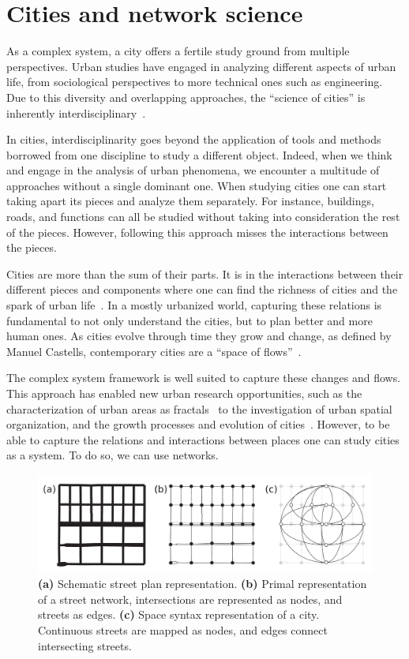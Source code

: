 \section*{Cities and network science}

As a complex system, a city offers a fertile study ground from multiple perspectives. Urban studies have engaged in analyzing different aspects of urban life, from sociological perspectives to more technical ones such as engineering. Due to this diversity and overlapping approaches, the ``science of cities'' is inherently interdisciplinary~\cite{batty2013new}.

In cities, interdisciplinarity goes beyond the application of tools and methods borrowed from one discipline to study a different object. Indeed, when we think and engage in the analysis of urban phenomena, we encounter a multitude of approaches without a single dominant one. When studying cities one can start taking apart its pieces and analyze them separately. For instance, buildings, roads, and functions can all be studied without taking into consideration the rest of the pieces. However, following this approach misses the interactions between the pieces. 

Cities are more than the sum of their parts. It is in the interactions between their different pieces and components where one can find the richness of cities and the spark of urban life~\cite{Jacobs1961Death}. In a mostly urbanized world, capturing these relations is fundamental to not only understand the cities, but to plan better and more human ones. As cities evolve through time they grow and change, as defined by Manuel Castells, contemporary cities are a ``space of flows''~\cite{castells1989informational}. 

The complex system framework is well suited to capture these changes and flows. This approach has enabled new urban research opportunities, such as the characterization of urban areas as fractals~\cite{batty1996preliminary} to the investigation of urban spatial organization, and the growth processes and evolution of cities~\cite{makse1995growth}. However, to be able to capture the relations and interactions between places one can study cities as a system. To do so, we can use networks.

\begin{figure}[th!]
	\centering
	\includegraphics[width=\textwidth]{images/introduction/networks.pdf}
	\caption[Network representation of a city]{\textbf{(a)} Schematic street plan representation. \textbf{(b)} Primal representation of a street network, intersections are represented as nodes, and streets as edges. \textbf{(c)} Space syntax representation of a city. Continuous streets are mapped as nodes, and edges connect intersecting streets.}
	\label{fig:networks}
\end{figure}


